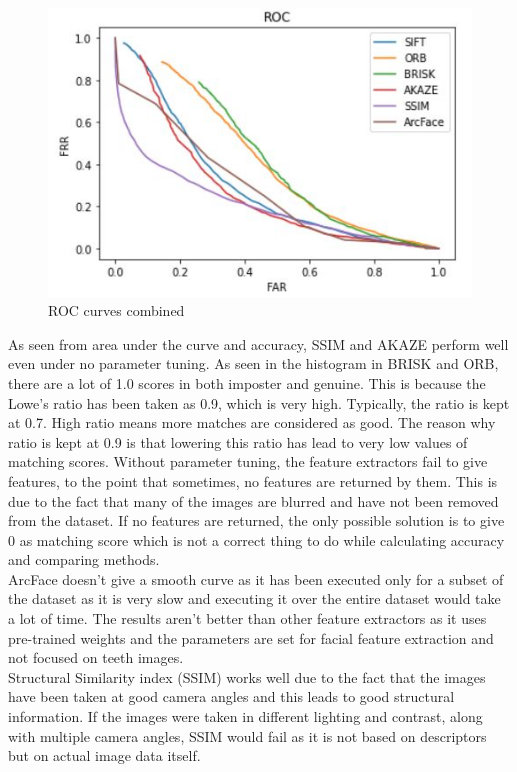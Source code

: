 \documentclass{article}
\begin{document}
\begin{figure}
  \centering
   \includegraphics[scale=1.0]{./imgs/literally_all_roc.jpg}
   \caption{ROC curves combined}
   \label{fig:architecture}
\end{figure}
As seen from area under the curve and accuracy, SSIM and AKAZE perform well even under no parameter tuning. As seen in the histogram in BRISK and ORB, there are a lot of 1.0 scores in both imposter and genuine. This is because the Lowe's ratio has been taken as 0.9, which is very high. Typically, the ratio is kept at 0.7. High ratio means more matches are considered as good. The reason why ratio is kept at 0.9 is that lowering this ratio has lead to very low values of matching scores. Without parameter tuning, the feature extractors fail to give features, to the point that sometimes, no features are returned by them. This is due to the fact that many of the images are blurred and have not been removed from the dataset. If no features are returned, the only possible solution is to give 0 as matching score which is not a correct thing to do while calculating accuracy and comparing methods.\\
ArcFace doesn't give a smooth curve as it has been executed only for a subset of the dataset as it is very slow and executing it over the entire dataset would take a lot of time. The results aren't better than other feature extractors as it uses pre-trained weights and the parameters are set for facial feature extraction and not focused on teeth images.\\
Structural Similarity index (SSIM) works well due to the fact that the images have been taken at good camera angles and this leads to good structural information. If the images were taken in different lighting and contrast, along with multiple camera angles, SSIM would fail as it is not based on descriptors but on actual image data itself. 
\end{document}
